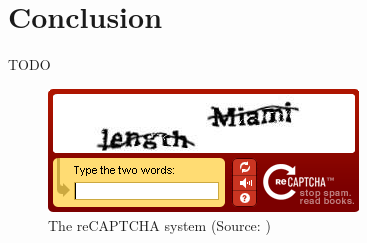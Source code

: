 \documentclass[pdftex,a4paper,12pt,twoside]{report}
\theoremstyle{plain} \newtheorem{theorem}{Theorem} \newtheorem{proposition}{Proposition} \newtheorem{lemma}{Lemma} \newtheorem*{corollary}{Corollary}
\theoremstyle{definition} \newtheorem{definition}{Definition} \newtheorem{conjecture}{Conjecture} \newtheorem*{example}{Example} \newtheorem{algorithm}{Algorithm}
\theoremstyle{remark} \newtheorem*{remark}{Remark} \newtheorem*{note}{Note} \newtheorem{case}{Case}
\begin{document}
\chapter{Conclusion}
\label{ch:conclusie}
TODO
%
%
\appendix
%
%
%


%
%
\listoffigures
\begin{figure}
	\centering
	\includegraphics[width=\textwidth]{./img/reCAPTCHA.png}
	\caption{The reCAPTCHA system (Source: \citep{UNDP2013})}
	\label{fig:reCAPTCHA}
\end{figure}
\end{document}
